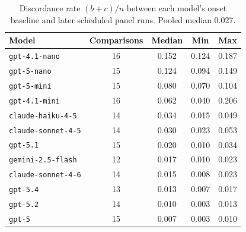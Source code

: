 \begin{table}[htbp]
    \centering
    \footnotesize
    \caption{Discordance rate $(b+c)/n$ between each model's onset baseline and later
    scheduled panel runs. Pooled median 0.027.}
    \label{tab:discordance}
    \begin{tabular}{lcccc}
    \toprule
    Model & Comparisons & Median & Min & Max \\
    \midrule
    \texttt{gpt-4.1-nano} & 16 & 0.152 & 0.124 & 0.187 \\
    \texttt{gpt-5-nano} & 15 & 0.124 & 0.094 & 0.149 \\
    \texttt{gpt-5-mini} & 15 & 0.080 & 0.070 & 0.104 \\
    \texttt{gpt-4.1-mini} & 16 & 0.062 & 0.040 & 0.206 \\
    \texttt{claude-haiku-4-5} & 14 & 0.034 & 0.015 & 0.049 \\
    \texttt{claude-sonnet-4-5} & 14 & 0.030 & 0.023 & 0.053 \\
    \texttt{gpt-5.1} & 15 & 0.020 & 0.010 & 0.034 \\
    \texttt{gemini-2.5-flash} & 12 & 0.017 & 0.010 & 0.023 \\
    \texttt{claude-sonnet-4-6} & 14 & 0.015 & 0.008 & 0.023 \\
    \texttt{gpt-5.4} & 13 & 0.013 & 0.007 & 0.017 \\
    \texttt{gpt-5.2} & 14 & 0.010 & 0.003 & 0.013 \\
    \texttt{gpt-5} & 15 & 0.007 & 0.003 & 0.010 \\
    \bottomrule
    \end{tabular}
\end{table}
